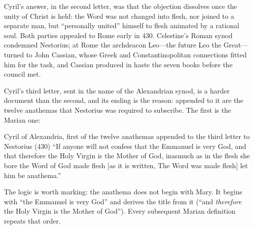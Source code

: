Cyril's answer, in the second letter, was that the objection dissolves
once the unity of Christ is held: the Word was not changed into flesh,
nor joined to a separate man, but ``personally united'' himself to flesh
animated by a rational soul. Both parties appealed to Rome early in 430.
Celestine's Roman synod condemned Nestorius; at Rome the archdeacon
Leo---the future Leo the Great---turned to John Cassian, whose Greek and
Constantinopolitan connections fitted him for the task, and Cassian
produced in haste the seven books  before the council met.

Cyril's third letter, sent in the name of the Alexandrian synod, is a
harder document than the second, and its ending is the reason: appended
to it are the twelve anathemas that Nestorius was required to subscribe.
The first is the Marian one:

\begin{definedtext}{Cyril of Alexandria, first of the twelve anathemas
appended to the third letter to Nestorius (430)}
``If anyone will not confess that the Emmanuel is very God, and that
therefore the Holy Virgin is the Mother of God, inasmuch as in the flesh
she bore the Word of God made flesh [as it is written, The Word was made
flesh] let him be anathema.''
\end{definedtext}

The logic is worth marking: the anathema does not begin with Mary. It
begins with ``the Emmanuel is very God'' and derives the title from it
(``and \emph{therefore} the Holy Virgin is the Mother of God''). Every
subsequent Marian definition repeats that order.

